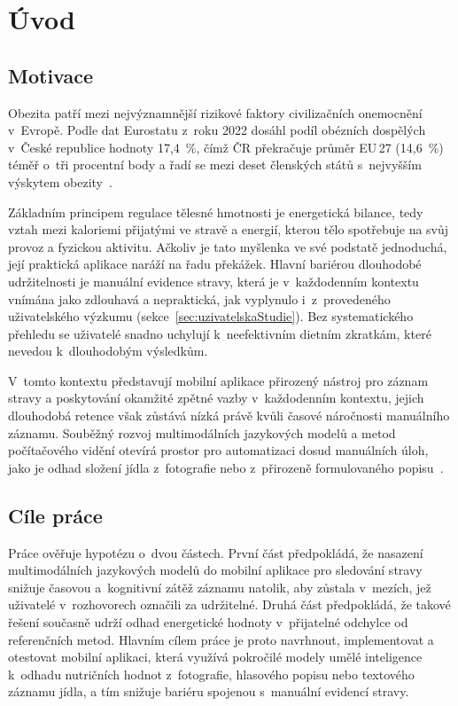 \chapter{Úvod}
\label{ch:uvod}

\section{Motivace}
\label{sec:motivace}

Obezita patří mezi nejvýznamnější rizikové faktory civilizačních onemocnění v~Evropě.
Podle dat Eurostatu z~roku 2022 dosáhl podíl obézních dospělých v~České republice hodnoty 17,4~\%, čímž ČR překračuje průměr EU\,27 (14,6~\%) téměř o~tři procentní body a řadí se mezi deset členských států s~nejvyšším výskytem obezity~\cite{eurostatBmi2022}.

Základním principem regulace tělesné hmotnosti je energetická bilance, tedy vztah mezi kaloriemi přijatými ve stravě a energií, kterou tělo spotřebuje na svůj provoz a fyzickou aktivitu.
Ačkoliv je tato myšlenka ve své podstatě jednoduchá, její praktická aplikace naráží na řadu překážek.
Hlavní bariérou dlouhodobé udržitelnosti je manuální evidence stravy, která je v~každodenním kontextu vnímána jako zdlouhavá a nepraktická, jak vyplynulo i~z~provedeného uživatelského výzkumu (sekce~\ref{sec:uzivatelskaStudie}).
Bez systematického přehledu se uživatelé snadno uchylují k~neefektivním dietním zkratkám, které nevedou k~dlouhodobým výsledkům.

V~tomto kontextu představují mobilní aplikace přirozený nástroj pro záznam stravy a poskytování okamžité zpětné vazby v~každodenním kontextu, jejich dlouhodobá retence však zůstává nízká právě kvůli časové náročnosti manuálního záznamu.
Souběžný rozvoj multimodálních jazykových modelů a metod počítačového vidění otevírá prostor pro automatizaci dosud manuálních úloh, jako je odhad složení jídla z~fotografie nebo z~přirozeně formulovaného popisu~\cite{wang2026visionLanguageFood}.

\section{Cíle práce}
\label{sec:cile}

Práce ověřuje hypotézu o~dvou částech.
První část předpokládá, že nasazení multimodálních jazykových modelů do mobilní aplikace pro sledování stravy snižuje časovou a~kognitivní zátěž záznamu natolik, aby zůstala v~mezích, jež uživatelé v~rozhovorech označili za udržitelné.
Druhá část předpokládá, že takové řešení současně udrží odhad energetické hodnoty v~přijatelné odchylce od referenčních metod.
Hlavním cílem práce je proto navrhnout, implementovat a otestovat mobilní aplikaci, která využívá pokročilé modely umělé inteligence k~odhadu nutričních hodnot z~fotografie, hlasového popisu nebo textového záznamu jídla, a tím snižuje bariéru spojenou s~manuální evidencí stravy.

